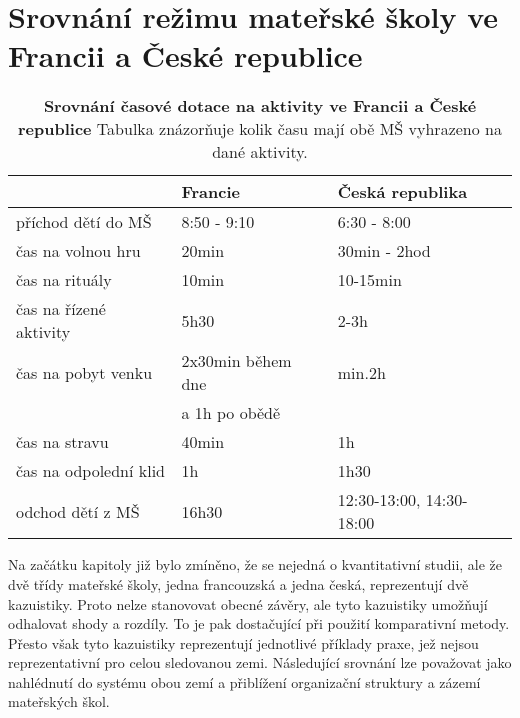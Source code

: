 \section{Srovnání režimu mateřské školy ve Francii a České republice} 
\label{srovnani} 

\begin{table}[h]
	
	\begin{tabular}{|l|l|l|}
	\hline
	\rowcolor{grey}
								& \textbf{Francie}				& \textbf{Česká republika}	\\
	\hline
	\hline
\rowcolor{grey!10}	 příchod dětí do MŠ			& 8:50 - 9:10				& 6:30 - 8:00			\\ 
\rowcolor{grey!50}	 čas na volnou hru 			& 20min 					&30min - 2hod 	\\ 
\rowcolor{grey!10}	 čas na rituály 			&10min 						&10-15min \\
\rowcolor{grey!50}	 čas na řízené aktivity		&5h30 						&2-3h   \\ 
\rowcolor{grey!10}	 čas na pobyt venku     	&2x30min během dne			&min.2h 	\\ 
\rowcolor{grey!10}								&a 1h po obědě				& \\ 
\rowcolor{grey!50}	 čas na stravu				&40min						&1h \\
\rowcolor{grey!10}	 čas na odpolední klid 	 	&1h 						&1h30 	\\
\rowcolor{grey!50}	 odchod dětí z MŠ			&16h30						&12:30-13:00, 14:30-18:00	\\														 
	 \hline
	  
	\end{tabular}
	
	\caption{ \textbf{Srovnání časové dotace na aktivity ve Francii a České republice} Tabulka znázorňuje kolik času mají obě MŠ vyhrazeno na dané aktivity.
	}
	\label{srovnanirezimdne}
\end{table}


	Na začátku kapitoly již bylo zmíněno, že se nejedná o kvantitativní studii, ale že dvě třídy mateřské školy, jedna francouzská a jedna česká, reprezentují dvě kazuistiky. Proto nelze stanovovat obecné závěry, ale tyto kazuistiky umožňují odhalovat shody a rozdíly. To je pak dostačující při použití komparativní metody. Přesto však tyto kazuistiky reprezentují jednotlivé příklady praxe, jež nejsou reprezentativní pro celou sledovanou zemi. Následující srovnání lze považovat jako nahlédnutí do systému obou zemí a přiblížení organizační struktury a zázemí mateřských škol.


